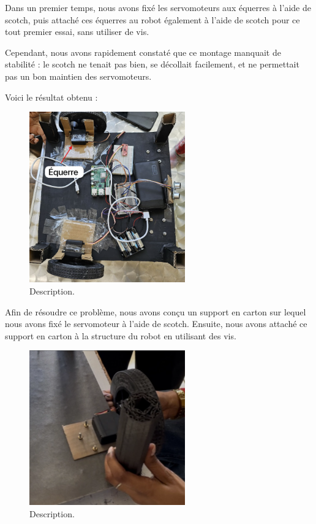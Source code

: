 \documentclass[a4paper,12pt]{report}  %
\begin{document}
Dans un premier temps, nous avons fixé les servomoteurs aux équerres à l’aide de scotch, puis attaché ces équerres au robot également à l’aide de scotch pour ce tout premier essai, sans utiliser de vis.

Cependant, nous avons rapidement constaté que ce montage manquait de stabilité : le scotch ne tenait pas bien, se décollait facilement, et ne permettait pas un bon maintien des servomoteurs.

Voici le résultat obtenu :
\begin{figure}[H]
	\centering
	\includegraphics[width=0.6\textwidth]{./attachments/servomoteur-roues.png}
	\caption{Description.}
\end{figure}

Afin de résoudre ce problème, nous avons conçu un support en carton sur lequel nous avons fixé le servomoteur à l’aide de scotch. Ensuite, nous avons attaché ce support en carton à la structure du robot en utilisant des vis. 

\begin{figure}[H]
	\centering
	\includegraphics[width=0.6\textwidth]{./attachments/servomoteur-roues_vis.png}
	\caption{Description.}
\end{figure}
\end{document}
